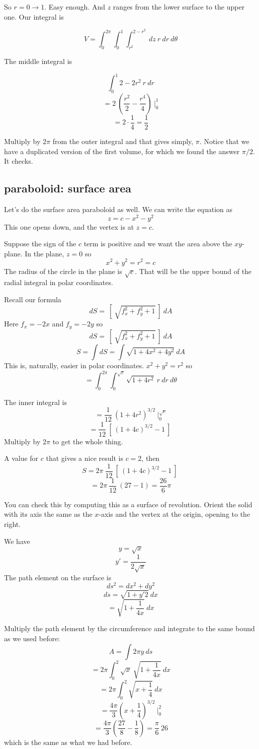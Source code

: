\documentclass[11pt, oneside]{article}   	%
\begin{document}
So $r = 0 \rightarrow 1$.  Easy enough.  And $z$ ranges from the lower surface to the upper one.  Our integral is

\[ V = \int_0^{2\pi} \int_0^1 \int_{r^2}^{2-r^2} \ dz \ r \ dr \ d \theta \]

The middle integral is

\[ \int_0^1 2 - 2r^2 \ r \ dr  \]
\[ = 2\ (\frac{r^2}{2} - \frac{r^4}{4}) \ \bigg |_0^1 \]
\[ = 2 \cdot \frac{1}{4} = \frac{1}{2} \]

Multiply by $2\pi$ from the outer integral and that gives simply, $\pi$.  Notice that we have a duplicated version of the first volume, for which we found the answer $\pi/2$.  It checks.

\subsection*{paraboloid:  surface area}

Let's do the surface area paraboloid as well.  We can write the equation as
\[ z =  c - x^2 - y^2 \]
This one opens down, and the vertex is at $z = c$.

Suppose the sign of the $c$ term is positive and we want the area above the $xy$-plane.  In the plane, $z = 0$ so
\[ x^2 + y^2 = r^2 = c \]
The radius of the circle in the plane is $\sqrt{c}$.  That will be the upper bound of the radial integral in polar coordinates.

Recall our formula
\[ dS = \ [ \ \sqrt{f_x^2 + f_y^2 + 1} \  ] \ dA \]
Here $f_x = -2x$ and $f_y = -2y$ so
\[ dS = \ [ \ \sqrt{f_x^2 + f_y^2 + 1} \  ] \ dA \]
\[ S = \int dS = \int \sqrt{1 + 4x^2 + 4y^2} \ dA \]
This is, naturally, easier in polar coordinates.  $x^2 + y^2 = r^2$ so
\[ = \int_0^{2 \pi} \int_0^{\sqrt{c}} \sqrt{1 + 4r^2} \ r \ dr \ d \theta \]

The inner integral is
\[ = \frac{1}{12} \ (1 + 4r^2)^{3/2} \ \bigg |_0^{\sqrt{c}} \]
\[ = \frac{1}{12} \ [ \ (1 + 4c)^{3/2} - 1 \ ] \ \]
Multiply by $2 \pi$ to get the whole thing.

A value for $c$ that gives a nice result is $c = 2$, then
\[ S = 2 \pi \ \frac{1}{12} \ [ \ (1 + 4c)^{3/2} - 1 \ ] \ \]
\[ = 2 \pi \ \frac{1}{12} \ (27 - 1) = \frac{26}{6} \pi \]

You can check this by computing this as a surface of revolution.  Orient the solid with its axis the same as the $x$-axis and the vertex at the origin, opening to the right.

We have
\[ y = \sqrt{x} \]
\[ y' = \frac{1}{2 \sqrt{x}} \]
The path element on the surface is 
\[ ds^2 = dx^2 + dy^2 \]
\[ ds = \sqrt{1 + y'2} \ dx \]
\[ = \sqrt{1 + \frac{1}{4x} } \ dx \]

Multiply the path element by the circumference and integrate to the same bound as we used before:
\[ A = \int 2 \pi y \ ds \]
\[ = 2 \pi \int_0^2 \sqrt{x} \ \sqrt{1 + \frac{1}{4x} } \ dx \] 
\[ = 2 \pi \int_0^2 \sqrt{x + \frac{1}{4} } \ dx \] 
\[ = \frac{4\pi}{3} (x + \frac{1}{4})^{3/2} \ \bigg |_0^2 \]
\[ = \frac{4\pi}{3} ( \frac{27}{8} - \frac{1}{8}) =  \frac{\pi}{6} \ 26 \]
which is the same as what we had before.
\end{document}
